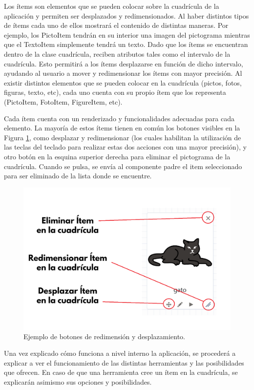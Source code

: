 Los ítems son elementos que se pueden colocar sobre la cuadrícula de la aplicación y permiten ser desplazados y redimensionados. Al haber distintos tipos de ítems cada uno de ellos mostrará el contenido de distintas maneras. Por ejemplo, los PictoItem tendrán en su interior una imagen del pictograma mientras que el TextoItem simplemente tendrá un texto. Dado que los ítems se encuentran dentro de la clase cuadrícula, reciben atributos tales como el intervalo de la cuadrícula. Esto permitirá a los ítems desplazarse en función de dicho intervalo, ayudando al usuario a mover y redimensionar los ítems con mayor precisión. Al existir distintos elementos que se pueden colocar en la cuadrícula (pictos, fotos, figuras, texto, etc), cada uno cuenta con su propio  ítem que los representa (PictoItem, FotoItem, FigureItem, etc).


Cada ítem cuenta con un renderizado y funcionalidades adecuadas para cada elemento. La mayoría de estos ítems tienen en común los botones visibles en la Figura \ref{fig:botonesitem}, como desplazar y redimensionar (los cuales habilitan la utilización de las teclas del teclado para realizar estas dos acciones con una mayor precisión), y otro botón en la esquina superior derecha para eliminar el pictograma de la cuadrícula. Cuando se pulsa, se envía al componente padre el item seleccionado para ser eliminado de la lista donde se encuentre.

\begin{figure}[h!]
	\centering
	\includegraphics[width=0.7\linewidth]{Imagenes/Bitmap/botonesItem}
	\caption{Ejemplo de botones de redimensión y desplazamiento.}
	\label{fig:botonesitem}
\end{figure}


Una vez explicado cómo funciona a nivel interno la aplicación, se procederá a explicar a ver el funcionamiento de las distintas herramientas y las posibilidades que ofrecen. En caso de que una herramienta cree un ítem en la cuadrícula, se explicarán asimismo sus opciones y posibilidades. 



